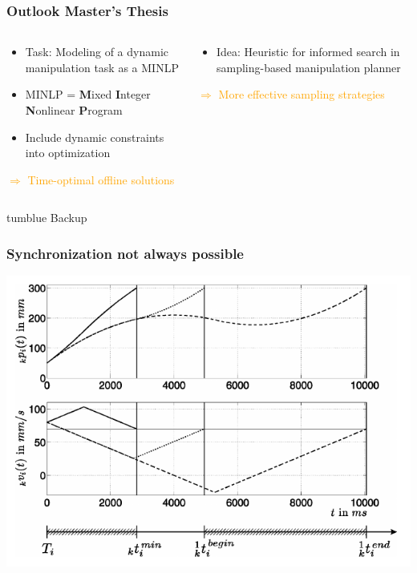 \documentclass[12pt, %
			  t     %
]{beamer}%
\begin{document}
\begin{frame}
\frametitle{Outlook Master's Thesis}
\begin{columns}[T]
\begin{column}{.55\textwidth}
\small
\begin{itemize}
\item Task: Modeling of a dynamic manipulation task as a MINLP
\item MINLP = \textbf{M}ixed \textbf{I}nteger \textbf{N}onlinear \textbf{P}rogram
\item Include dynamic constraints into optimization
\end{itemize}
\textcolor{orange}{$\Rightarrow$ Time-optimal offline solutions}
\end{column}

\begin{column}{.45\textwidth}
\small
\begin{itemize}
\item Idea: Heuristic for informed search in sampling-based manipulation planner
\end{itemize}
\textcolor{orange}{$\Rightarrow$ More effective sampling strategies}
\end{column}
\end{columns}
\end{frame}


\begin{frame}
\centering
\begin{beamercolorbox}[wd=\paperwidth,ht=5cm,dp=1ex,center]{tumblue}
 \textcolor{tumblue}{Backup}
\end{beamercolorbox}
\end{frame}

\begin{frame}
\frametitle{Synchronization not always possible}
\centering
\includegraphics[scale=0.5]{../Images/SynchronizationNotPossible.png}
\end{frame}
\end{document}
